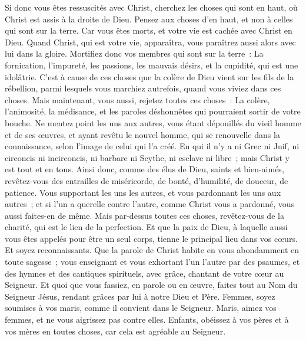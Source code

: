 \begin{multicols}{2}
\VerseOne{}Si donc vous êtes ressuscités avec Christ, cherchez les choses qui sont en haut, où Christ est assis à la droite de Dieu.
Pensez aux choses d'en haut, et non à celles qui sont sur la terre.
Car vous êtes morts, et votre vie est cachée avec Christ en Dieu.
Quand Christ, qui est votre vie, apparaîtra, vous paraîtrez aussi alors avec lui dans la gloire.
Mortifiez donc vos membres qui sont sur la terre~: La fornication, l'impureté, les passions, les mauvais désirs, et la cupidité, qui est une idolâtrie.
C'est à cause de ces choses que la colère de Dieu vient sur les fils de la rébellion,
parmi lesquels vous marchiez autrefois, quand vous viviez dans ces choses.
Mais maintenant, vous aussi, rejetez toutes ces choses~: La colère, l'animosité, la médisance, et les paroles déshonnêtes qui pourraient sortir de votre bouche.
Ne mentez point les uns aux autres, vous étant dépouillés du vieil homme et de ses œuvres,
et ayant revêtu le nouvel homme, qui se renouvelle dans la connaissance, selon l'image de celui qui l'a créé.
En qui il n'y a ni Grec ni Juif, ni circoncis ni incirconcis, ni barbare ni Scythe, ni esclave ni libre~; mais Christ y est tout et en tous.
Ainsi donc, comme des élus de Dieu, saints et bien-aimés, revêtez-vous des entrailles de miséricorde, de bonté, d'humilité, de douceur, de patience.
Vous supportant les uns les autres, et vous pardonnant les uns aux autres~; et si l'un a querelle contre l'autre, comme Christ vous a pardonné, vous aussi faites-en de même.
Mais par-dessus toutes ces choses, revêtez-vous de la charité, qui est le lien de la perfection.
Et que la paix de Dieu, à laquelle aussi vous êtes appelés pour être un seul corps, tienne le principal lieu dans vos cœurs. Et soyez reconnaissants.
Que la parole de Christ habite en vous abondamment en toute sagesse~; vous enseignant et vous exhortant l'un l'autre par des psaumes, et des hymnes et des cantiques spirituels, avec grâce, chantant de votre cœur au Seigneur.
Et quoi que vous fassiez, en parole ou en œuvre, faites tout au Nom du Seigneur Jésus, rendant grâces par lui à notre Dieu et Père.
Femmes, soyez soumises à vos maris, comme il convient dans le Seigneur.
Maris, aimez vos femmes, et ne vous aigrissez pas contre elles.
Enfants, obéissez à vos pères et à vos mères en toutes choses, car cela est agréable au Seigneur.

\end{multicols}
